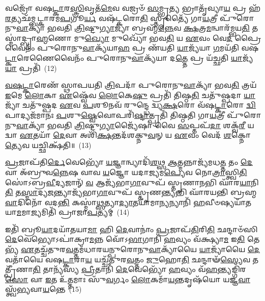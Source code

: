 𑌵𑌜𑍍𑌰𑍋᳴ 𑌵𑌷\-\ul{𑌟𑍍𑌕𑌾}\-𑌰\-\ul{𑌸𑍍𑌤𑍍𑌰𑌿}\-𑌵𑍃𑌤᳴\-\ul{𑌮𑍇}\-𑌵 𑌵𑌜𑍍𑌰𑍞᳴ \ul{𑌸}\-𑌮𑍍𑌭𑍃\-\ul{𑌤𑍍𑌯} 𑌭𑍍𑌰𑌾𑌤𑍃᳴𑌵𑍍𑌯𑌾\-\ul{𑌯} 𑌪𑍍𑌰 𑌹᳴\-\ul{𑌰}\-𑌤𑍍𑌯𑌛᳴𑌮𑍍𑌬𑌟𑍍𑌕𑌾𑌰𑌮\-\ul{𑌪}\-𑌗𑍂\-\ul{𑌰𑍍𑌯} 𑌵𑌷᳴𑌟𑍍𑌕𑌰𑍋\-\ul{𑌤𑌿} 𑌸𑍍𑌤𑍃𑌤𑍍𑌯𑍈᳴ 𑌗𑌾\-\ul{𑌯}\-𑌤𑍍𑌰𑍀 𑌪𑍁᳴𑌰𑍋𑌨𑍁\-\ul{𑌵𑌾}\-𑌕𑍍𑌯𑌾᳴ 𑌭𑌵𑌤𑌿 \ul{𑌤𑍍𑌰𑌿}\-𑌷𑍍𑌟𑍁\-\ul{𑌗𑍍𑌯𑌾}\-𑌜𑍍𑌯𑌾॑ 𑌬𑍍𑌰𑌹𑍍𑌮᳴\-\ul{𑌨𑍍𑌨𑍇}\-𑌵 \ul{𑌕𑍍𑌷}\-𑌤𑍍𑌰\-\ul{𑌮}\-𑌨𑍍𑌵𑌾𑌰᳴𑌮𑍍𑌭𑌯\-\ul{𑌤𑌿} 𑌤𑌸𑍍𑌮𑌾॑𑌦𑍍𑌬𑍍𑌰𑌾\-\ul{𑌹𑍍𑌮}\-𑌣𑍋 𑌮𑍁\-\ul{𑌖𑍍𑌯𑍋} 𑌮𑍁𑌖𑍍𑌯𑍋᳴ 𑌭𑌵\-\ul{𑌤𑌿} 𑌯 \ul{𑌏}\-𑌵𑌂 𑌵𑍇\-\ul{𑌦} 𑌪𑍍𑌰𑍈𑌵𑍈𑌨𑌂᳴ 𑌪𑍁𑌰𑍋𑌨𑍁\-\ul{𑌵𑌾}\-𑌕𑍍𑌯᳴𑌯𑌾\-\ul{𑌹} 𑌪𑍍𑌰 𑌣᳴𑌯𑌤𑌿 \ul{𑌯𑌾}\-𑌜𑍍𑌯᳴𑌯𑌾 \ul{𑌗}\-𑌮𑌯᳴𑌤𑌿 𑌵𑌷\-\ul{𑌟𑍍𑌕𑌾}\-𑌰𑍇𑌣𑍈𑌵𑍈𑌨𑌂᳴ 𑌪𑍁𑌰𑍋𑌨𑍁\-\ul{𑌵𑌾}\-𑌕𑍍𑌯᳴𑌯𑌾 𑌦\-\ul{𑌤𑍍𑌤𑍇} 𑌪𑍍𑌰 𑌯᳴𑌚𑍍𑌛𑌤𑌿 \ul{𑌯𑌾}\-𑌜𑍍𑌯᳴\-\ul{𑌯𑌾} 𑌪𑍍𑌰𑌤𑌿᳴~(12)

\-\ul{𑌵}\-\-\ul{𑌷}\-\-\ul{𑌟𑍍𑌕𑌾}\-𑌰𑍇𑌣᳴ 𑌸𑍍𑌥𑌾𑌪𑌯𑌤𑌿 \ul{𑌤𑍍𑌰𑌿}\-𑌪𑌦𑌾᳴ 𑌪𑍁𑌰𑍋𑌨𑍁\-\ul{𑌵𑌾}\-𑌕𑍍𑌯𑌾᳴ 𑌭𑌵\-\ul{𑌤𑌿} 𑌤𑍍𑌰𑌯᳴ \ul{𑌇}\-𑌮𑍇 \ul{𑌲𑍋}\-𑌕𑌾 \ul{𑌏}\-𑌷𑍍𑌵𑍇᳴𑌵 \ul{𑌲𑍋}\-𑌕𑍇\-\ul{𑌷𑍁} 𑌪𑍍𑌰𑌤𑌿᳴ 𑌤𑌿𑌷𑍍𑌠\-\ul{𑌤𑌿} 𑌚𑌤𑍁᳴𑌷𑍍𑌪𑌦𑌾 \ul{𑌯𑌾}\-𑌜𑍍𑌯𑌾᳴ 𑌚𑌤𑍁᳴𑌷𑍍𑌪𑌦 \ul{𑌏}\-𑌵 \ul{𑌪}\-𑌶𑍂𑌨𑌵᳴ 𑌰𑍁𑌨𑍍𑌦𑍍𑌧𑍇 𑌦𑍍𑌵𑍍𑌯\-\ul{𑌕𑍍𑌷}\-𑌰𑍋 𑌵᳴𑌷\-\ul{𑌟𑍍𑌕𑌾}\-𑌰𑍋 \ul{𑌦𑍍𑌵𑌿}\-𑌪𑌾𑌦𑍍𑌯𑌜᳴𑌮𑌾𑌨𑌃 \ul{𑌪}\-𑌶𑍁\-\ul{𑌷𑍍𑌵𑍇}\-𑌵𑍋𑌪𑌰𑌿᳴\-\ul{𑌷𑍍𑌟𑌾}\-𑌤𑍍𑌪𑍍𑌰𑌤𑌿᳴ 𑌤𑌿𑌷𑍍𑌠𑌤𑌿 𑌗𑌾\-\ul{𑌯}\-𑌤𑍍𑌰𑍀 𑌪𑍁᳴𑌰𑍋𑌨𑍁\-\ul{𑌵𑌾}\-𑌕𑍍𑌯𑌾᳴ 𑌭𑌵𑌤𑌿 \ul{𑌤𑍍𑌰𑌿}\-𑌷𑍍𑌟𑍁\-\ul{𑌗𑍍𑌯𑌾}\-𑌜𑍍𑌯𑍈᳴𑌷𑌾 𑌵𑍈 \ul{𑌸}\-𑌪𑍍𑌤𑌪᳴\-\ul{𑌦𑌾} 𑌶𑌕𑍍𑌵᳴\-\ul{𑌰𑍀} 𑌯𑌦𑍍𑌵𑌾 \ul{𑌏}\-𑌤𑌯𑌾᳴ \ul{𑌦𑍇}\-𑌵𑌾 𑌅𑌶𑌿᳴\-\ul{𑌕𑍍𑌷}\-𑌨𑍍𑌤𑌦᳴𑌶𑌕𑍍𑌨𑍁\-\ul{𑌵}\-𑌨𑍍 𑌯 \ul{𑌏}\-𑌵𑌂 𑌵𑍇𑌦᳴ \ul{𑌶}\-𑌕𑍍𑌨𑍋\-\ul{𑌤𑍍𑌯𑍇}\-𑌵 𑌯𑌚𑍍𑌛𑌿𑌕𑍍𑌷᳴𑌤𑌿॥~(13)

{\anuvakamend[{\-\ul{𑌦𑍇}\-𑌵𑌤𑌾᳴𑌨𑌾𑌙𑍍𑌕𑌰𑍋\-\ul{𑌤𑍍𑌯𑍁}\-𑌪𑌰𑌿᳴𑌷𑍍𑌟𑌾\-\ul{𑌲𑍍𑌲}\-𑌕𑍍𑌷𑍍𑌮𑌾\-𑌽\-𑌽𑌜𑍍𑌯᳴𑌭𑌾\-\ul{𑌗𑍗} 𑌪𑍍𑌰𑌤𑌿᳴ \ul{𑌶}\-𑌕𑍍𑌨𑍋\-\ul{𑌤𑍍𑌯𑍇}\-𑌵 𑌦𑍍𑌵𑍇 𑌚᳴}]}%

\-\ul{𑌪𑍍𑌰}\-𑌜𑌾𑌪᳴𑌤𑌿\-\ul{𑌰𑍍𑌦𑍇}\-𑌵𑍇𑌭𑍍𑌯𑍋᳴ \ul{𑌯}\-𑌜𑍍𑌞𑌾𑌨𑍍𑌵𑍍𑌯𑌾𑌦𑌿᳴\-\ul{𑌶}\-𑌥𑍍𑌸 \ul{𑌆}\-𑌤𑍍𑌮𑌨𑍍𑌨𑌾𑌜𑍍𑌯᳴𑌮𑌧\-\ul{𑌤𑍍𑌤} 𑌤𑌂 \ul{𑌦𑍇}\-𑌵𑌾 𑌅᳴𑌬𑍍𑌰𑍁𑌵\-\ul{𑌨𑍍𑌨𑍇}\-𑌷 𑌵𑌾𑌵 \ul{𑌯}\-𑌜𑍍𑌞𑍋 𑌯𑌦𑌾\-\ul{𑌜𑍍𑌯}\-𑌮\-\ul{𑌪𑍍𑌯𑍇}\-𑌵 𑌨𑍋\-\ul{𑌤𑍍𑌰𑌾}\-𑌸𑍍𑌤𑍍𑌵𑌿\-\ul{𑌤𑌿} 𑌸𑍋॑\-𑌽𑌬𑍍𑌰\-\ul{𑌵𑍀}\-𑌦𑍍𑌯𑌜𑌾𑌨𑍍᳴ \ul{𑌵} 𑌆𑌜𑍍𑌯᳴𑌭𑌾\-\ul{𑌗𑌾}\-𑌵𑍁𑌪᳴ 𑌸𑍍𑌤𑍃𑌣𑌾\-\ul{𑌨}\-𑌭𑌿 𑌘𑌾᳴𑌰\-\ul{𑌯𑌾}\-𑌨𑌿\-\ul{𑌤𑌿} 𑌤\-\ul{𑌸𑍍𑌮𑌾}\-𑌦𑍍𑌯\-\ul{𑌜}\-𑌨𑍍𑌤𑍍𑌯𑌾𑌜𑍍𑌯᳴𑌭𑌾\-\ul{𑌗𑌾}\-𑌵𑍁𑌪᳴ 𑌸𑍍𑌤𑍃𑌣\-\ul{𑌨𑍍𑌤𑍍𑌯}\-𑌭𑌿 𑌘𑌾᳴𑌰𑌯𑌨𑍍𑌤𑌿 𑌬𑍍𑌰𑌹𑍍𑌮\-\ul{𑌵𑌾}\-𑌦𑌿𑌨𑍋᳴ 𑌵𑌦\-\ul{𑌨𑍍𑌤𑌿} 𑌕𑌸𑍍𑌮𑌾॑\-\ul{𑌥𑍍𑌸}\-𑌤𑍍𑌯𑌾\-\ul{𑌦𑍍𑌯𑌾}\-𑌤𑌯𑌾᳴𑌮𑌾\-\ul{𑌨𑍍𑌯}\-𑌨𑍍𑌯𑌾𑌨𑌿᳴ \ul{𑌹}\-𑌵𑍀𑍞𑌷𑍍𑌯𑌯𑌾᳴𑌤𑌯𑌾\-\ul{𑌮}\-𑌮𑌾\-\ul{𑌜𑍍𑌯}\-𑌮𑌿𑌤𑌿᳴ 𑌪𑍍𑌰𑌾𑌜𑌾\-\ul{𑌪}\-𑌤𑍍𑌯𑌮𑍍~(14)

𑌇𑌤𑌿᳴ 𑌬𑍍𑌰𑍂\-\ul{𑌯𑌾}\-𑌦𑌯𑌾᳴𑌤𑌯𑌾\-\ul{𑌮𑌾} 𑌹𑌿 \ul{𑌦𑍇}\-𑌵𑌾𑌨𑌾𑌂॑ \ul{𑌪𑍍𑌰}\-𑌜𑌾𑌪᳴\-\ul{𑌤𑌿}\-𑌰𑌿\-\ul{𑌤𑌿} 𑌛𑌨𑍍𑌦𑌾𑍞᳴𑌸𑌿 \ul{𑌦𑍇}\-𑌵𑍇𑌭𑍍𑌯𑍋\-𑌽𑌪𑌾॑𑌕𑍍𑌰𑌾\-\ul{𑌮}\-𑌨𑍍𑌨 𑌵𑍋᳴\-𑌽\-\ul{𑌭𑌾}\-𑌗𑌾𑌨𑌿᳴ \ul{𑌹}\-𑌵𑍍𑌯𑌂 𑌵᳴𑌕𑍍𑌷𑍍𑌯𑌾\-\ul{𑌮} 𑌇\-\ul{𑌤𑌿} 𑌤𑍇𑌭𑍍𑌯᳴ \ul{𑌏}\-𑌤𑌚𑍍𑌚᳴𑌤𑍁𑌰\-\ul{𑌵}\-𑌤𑍍𑌤𑌮᳴𑌧𑌾𑌰𑌯𑌨𑍍𑌪𑍁𑌰𑍋𑌨𑍁\-\ul{𑌵𑌾}\-𑌕𑍍𑌯𑌾᳴𑌯𑍈 \ul{𑌯𑌾}\-𑌜𑍍𑌯𑌾᳴𑌯𑍈 \ul{𑌦𑍇}\-𑌵𑌤𑌾᳴𑌯𑍈 𑌵𑌷\-\ul{𑌟𑍍𑌕𑌾}\-𑌰𑌾\-\ul{𑌯} 𑌯𑌚𑍍𑌚᳴𑌤𑍁𑌰\-\ul{𑌵}\-𑌤𑍍𑌤𑌂 \ul{𑌜𑍁}\-𑌹𑍋\-\ul{𑌤𑌿} 𑌛𑌨𑍍𑌦𑌾𑍟᳴\-\ul{𑌸𑍍𑌯𑍇}\-𑌵 𑌤𑌤𑍍𑌪𑍍𑌰𑍀᳴𑌣𑌾\-\ul{𑌤𑌿} 𑌤𑌾𑌨𑍍𑌯᳴𑌸𑍍𑌯 \ul{𑌪𑍍𑌰𑍀}\-𑌤𑌾𑌨𑌿᳴ \ul{𑌦𑍇}\-𑌵𑍇𑌭𑍍𑌯𑍋᳴ \ul{𑌹}\-𑌵𑍍𑌯𑌂 𑌵᳴\-\ul{𑌹}\-𑌨𑍍𑌤𑍍𑌯𑌙𑍍𑌗𑌿᳴𑌰\-\ul{𑌸𑍋} 𑌵𑌾 \ul{𑌇}\-𑌤 𑌉᳴\-\ul{𑌤𑍍𑌤}\-𑌮𑌾𑌃 𑌸𑍁᳴\-\ul{𑌵}\-𑌰𑍍𑌗𑌂 \ul{𑌲𑍋}\-𑌕𑌮𑌾᳴\-\ul{𑌯}\-𑌨𑍍𑌤𑌦𑍃𑌷᳴𑌯𑍋 𑌯𑌜𑍍𑌞\-\ul{𑌵𑌾}\-𑌸𑍍𑌤𑍍𑌵᳴\-\ul{𑌭𑍍𑌯}\-𑌵𑌾\-\ul{𑌯}\-𑌨𑍍𑌤𑍇~(15)

